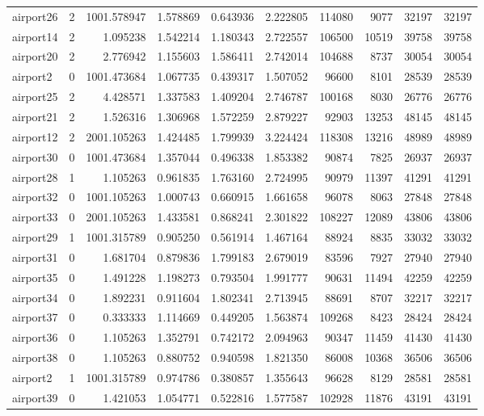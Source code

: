 \begin{longtable}{|l|r|r|r|r|r|r|r|r|r|}
airport26 & 2 & 1001.578947 & 1.578869 & 0.643936 & 2.222805 & 114080 & 9077 & 32197 & 32197 \\
airport14 & 2 & 1.095238 & 1.542214 & 1.180343 & 2.722557 & 106500 & 10519 & 39758 & 39758 \\
airport20 & 2 & 2.776942 & 1.155603 & 1.586411 & 2.742014 & 104688 & 8737 & 30054 & 30054 \\
airport2 & 0 & 1001.473684 & 1.067735 & 0.439317 & 1.507052 & 96600 & 8101 & 28539 & 28539 \\
airport25 & 2 & 4.428571 & 1.337583 & 1.409204 & 2.746787 & 100168 & 8030 & 26776 & 26776 \\
airport21 & 2 & 1.526316 & 1.306968 & 1.572259 & 2.879227 & 92903 & 13253 & 48145 & 48145 \\
airport12 & 2 & 2001.105263 & 1.424485 & 1.799939 & 3.224424 & 118308 & 13216 & 48989 & 48989 \\
airport30 & 0 & 1001.473684 & 1.357044 & 0.496338 & 1.853382 & 90874 & 7825 & 26937 & 26937 \\
airport28 & 1 & 1.105263 & 0.961835 & 1.763160 & 2.724995 & 90979 & 11397 & 41291 & 41291 \\
airport32 & 0 & 1001.105263 & 1.000743 & 0.660915 & 1.661658 & 96078 & 8063 & 27848 & 27848 \\
airport33 & 0 & 2001.105263 & 1.433581 & 0.868241 & 2.301822 & 108227 & 12089 & 43806 & 43806 \\
airport29 & 1 & 1001.315789 & 0.905250 & 0.561914 & 1.467164 & 88924 & 8835 & 33032 & 33032 \\
airport31 & 0 & 1.681704 & 0.879836 & 1.799183 & 2.679019 & 83596 & 7927 & 27940 & 27940 \\
airport35 & 0 & 1.491228 & 1.198273 & 0.793504 & 1.991777 & 90631 & 11494 & 42259 & 42259 \\
airport34 & 0 & 1.892231 & 0.911604 & 1.802341 & 2.713945 & 88691 & 8707 & 32217 & 32217 \\
airport37 & 0 & 0.333333 & 1.114669 & 0.449205 & 1.563874 & 109268 & 8423 & 28424 & 28424 \\
airport36 & 0 & 1.105263 & 1.352791 & 0.742172 & 2.094963 & 90347 & 11459 & 41430 & 41430 \\
airport38 & 0 & 1.105263 & 0.880752 & 0.940598 & 1.821350 & 86008 & 10368 & 36506 & 36506 \\
airport2 & 1 & 1001.315789 & 0.974786 & 0.380857 & 1.355643 & 96628 & 8129 & 28581 & 28581 \\
airport39 & 0 & 1.421053 & 1.054771 & 0.522816 & 1.577587 & 102928 & 11876 & 43191 & 43191 \\

\end{longtable}
